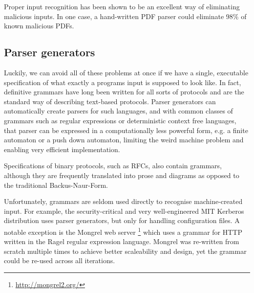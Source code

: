 \documentclass[10pt]{article}
\begin{document}
Proper input recognition has been shown to be an excellent way of eliminating malicious inputs. In
one case, a hand-written PDF parser could eliminate $98\%$ of known malicious PDFs\cite{Bogk-PDF}.


\subsection{Parser generators}
Luckily, we can avoid all of these problems at once if we have a single, executable specification of
what exactly a programs input is supposed to look like. In fact, definitive grammars have long
been written for all sorts of protocols and are the standard way of describing text-based protocols.
Parser generators can automatically create parsers for such languages, and with common classes of
grammars such as regular expressions or deterministic context free languages, that parser can be
expressed in a computationally less powerful form, e.g. a finite automaton or a push down automaton,
limiting the weird machine problem and enabling very efficient implementation. \cite{Knuth1965607}


Specifications of binary protocols, such as RFCs, also contain grammars, although they are
frequently translated into prose and diagrams as opposed to the traditional Backus-Naur-Form.  


Unfortunately, grammars are seldom used directly to recognise machine-created input. For example,
the security-critical and very well-engineered MIT Kerberos distribution uses parser
generators, but only for handling configuration files. A notable exception is the Mongrel
web server \footnote{\url{http://mongrel2.org/}} which uses a grammar for HTTP written in the
Ragel \cite{ragel-paper} regular expression language. Mongrel was re-written from scratch multiple
times to achieve better scaleability and design, yet the grammar could be  re-used across all iterations\cite{patterson-citation}.
\end{document}
